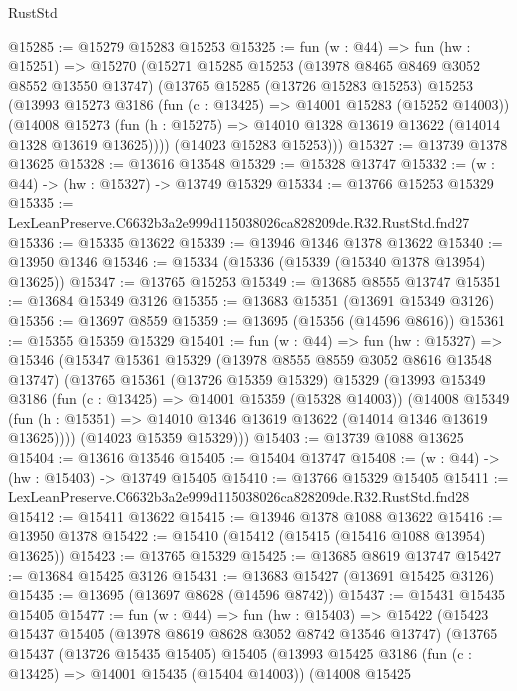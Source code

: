 \begin{lexlean}{RustStd}
\begin{coremodule}
@15285 := @15279 @15283 @15253
@15325 := fun (w : @44) =>
  fun (hw : @15251) =>
  @15270
    (@15271
      @15285
      @15253
      (@13978 @8465 @8469 @3052 @8552 @13550 @13747)
      (@13765
        @15285
        (@13726 @15283 @15253)
        @15253
        (@13993
          @15273
          @3186
          (fun (c : @13425) => @14001 @15283 (@15252 @14003))
          (@14008
            @15273
            (fun (h : @15275) => @14010 @1328 @13619 @13622 (@14014 @1328 @13619 @13625))))
        (@14023 @15283 @15253)))
@15327 := @13739 @1378 @13625
@15328 := @13616 @13548
@15329 := @15328 @13747
@15332 := (w : @44) -> (hw : @15327) -> @13749 @15329
@15334 := @13766 @15253 @15329
@15335 := LexLeanPreserve.C6632b3a2e999d115038026ca828209de.R32.RustStd.fnd27
@15336 := @15335 @13622
@15339 := @13946 @1346 @1378 @13622
@15340 := @13950 @1346
@15346 := @15334 (@15336 (@15339 (@15340 @1378 @13954) @13625))
@15347 := @13765 @15253
@15349 := @13685 @8555 @13747
@15351 := @13684 @15349 @3126
@15355 := @13683 @15351 (@13691 @15349 @3126)
@15356 := @13697 @8559
@15359 := @13695 (@15356 (@14596 @8616))
@15361 := @15355 @15359 @15329
@15401 := fun (w : @44) =>
  fun (hw : @15327) =>
  @15346
    (@15347
      @15361
      @15329
      (@13978 @8555 @8559 @3052 @8616 @13548 @13747)
      (@13765
        @15361
        (@13726 @15359 @15329)
        @15329
        (@13993
          @15349
          @3186
          (fun (c : @13425) => @14001 @15359 (@15328 @14003))
          (@14008
            @15349
            (fun (h : @15351) => @14010 @1346 @13619 @13622 (@14014 @1346 @13619 @13625))))
        (@14023 @15359 @15329)))
@15403 := @13739 @1088 @13625
@15404 := @13616 @13546
@15405 := @15404 @13747
@15408 := (w : @44) -> (hw : @15403) -> @13749 @15405
@15410 := @13766 @15329 @15405
@15411 := LexLeanPreserve.C6632b3a2e999d115038026ca828209de.R32.RustStd.fnd28
@15412 := @15411 @13622
@15415 := @13946 @1378 @1088 @13622
@15416 := @13950 @1378
@15422 := @15410 (@15412 (@15415 (@15416 @1088 @13954) @13625))
@15423 := @13765 @15329
@15425 := @13685 @8619 @13747
@15427 := @13684 @15425 @3126
@15431 := @13683 @15427 (@13691 @15425 @3126)
@15435 := @13695 (@13697 @8628 (@14596 @8742))
@15437 := @15431 @15435 @15405
@15477 := fun (w : @44) =>
  fun (hw : @15403) =>
  @15422
    (@15423
      @15437
      @15405
      (@13978 @8619 @8628 @3052 @8742 @13546 @13747)
      (@13765
        @15437
        (@13726 @15435 @15405)
        @15405
        (@13993
          @15425
          @3186
          (fun (c : @13425) => @14001 @15435 (@15404 @14003))
          (@14008
            @15425

\end{coremodule}
\end{lexlean}
